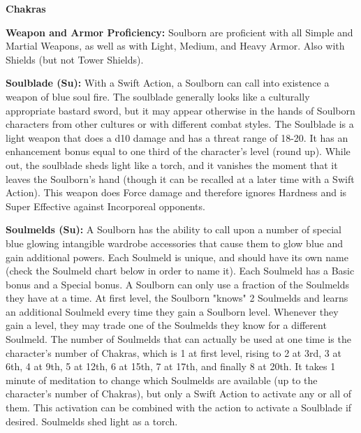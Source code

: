 \begin{extraclasstable}{\textbf{Chakras}}
\end{extraclasstable}

\classfeatures

\textbf{Weapon and Armor Proficiency:} Soulborn are proficient with all Simple and Martial Weapons, as well as with Light, Medium, and Heavy Armor. Also with Shields (but not Tower Shields). 

\textbf{Soulblade (Su):} With a Swift Action, a Soulborn can call into existence a weapon of blue soul fire. The soulblade generally looks like a culturally appropriate bastard sword, but it may appear otherwise in the hands of Soulborn characters from other cultures or with different combat styles. The Soulblade is a light weapon that does a d10 damage and has a threat range of 18-20. It has an enhancement bonus equal to one third of the character's level (round up). While out, the soulblade sheds light like a torch, and it vanishes the moment that it leaves the Soulborn's hand (though it can be recalled at a later time with a Swift Action). This weapon does Force damage and therefore ignores Hardness and is Super Effective against Incorporeal opponents. 

\textbf{Soulmelds (Su):} A Soulborn has the ability to call upon a number of special blue glowing intangible wardrobe accessories that cause them to glow blue and gain additional powers. Each Soulmeld is unique, and should have its own name (check the Soulmeld chart below in order to name it). Each Soulmeld has a Basic bonus and a Special bonus. A Soulborn can only use a fraction of the Soulmelds they have at a time. At first level, the Soulborn "knows" 2 Soulmelds and learns an additional Soulmeld every time they gain a Soulborn level. Whenever they gain a level, they may trade one of the Soulmelds they know for a different Soulmeld. The number of Soulmelds that can actually be used at one time is the character's number of Chakras, which is 1 at first level, rising to 2 at 3rd, 3 at 6th, 4 at 9th, 5 at 12th, 6 at 15th, 7 at 17th, and finally 8 at 20th. It takes 1 minute of meditation to change which Soulmelds are available (up to the character's number of Chakras), but only a Swift Action to activate any or all of them. This activation can be combined with the action to activate a Soulblade if desired. Soulmelds shed light as a torch. 

